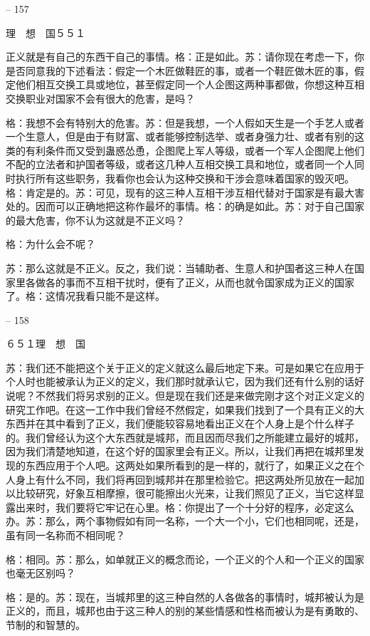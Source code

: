 \documentclass[11pt,oneside]{book}
\begin{document}
\begin{common-format}
    

-- 157

    理　想　国５５１

    正义就是有自己的东西干自己的事情。格：正是如此。苏：请你现在考虑一下，你是否同意我的下述看法：假定一个木匠做鞋匠的事，或者一个鞋匠做木匠的事，假定他们相互交换工具或地位，甚至假定同一个人企图这两种事都做，你想这种互相交换职业对国家不会有很大的危害，是吗？

    格：我想不会有特别大的危害。苏：但是我想，一个人假如天生是一个手艺人或者一个生意人，但是由于有财富、或者能够控制选举、或者身强力壮、或者有别的这类的有利条件而又受到蛊惑怂恿，企图爬上军人等级，或者一个军人企图爬上他们不配的立法者和护国者等级，或者这几种人互相交换工具和地位，或者同一个人同时执行所有这些职务，我看你也会认为这种交换和干涉会意味着国家的毁灭吧。格：肯定是的。苏：可见，现有的这三种人互相干涉互相代替对于国家是有最大害处的。因而可以正确地把这称作最坏的事情。格：的确是如此。苏：对于自己国家的最大危害，你不认为这就是不正义吗？

    格：为什么会不呢？

    苏：那么这就是不正义。反之，我们说：当辅助者、生意人和护国者这三种人在国家里各做各的事而不互相干扰时，便有了正义，从而也就令国家成为正义的国家了。格：这情况我看只能不是这样。

    

-- 158

    ６５１理　想　国

    苏：我们还不能把这个关于正义的定义就这么最后地定下来。可是如果它在应用于个人时也能被承认为正义的定义，我们那时就承认它，因为我们还有什么别的话好说呢？不然我们将另求别的正义。但是现在我们还是来做完刚才这个对正义定义的研究工作吧。在这一工作中我们曾经不然假定，如果我们找到了一个具有正义的大东西并在其中看到了正义，我们便能较容易地看出正义在个人身上是个什么样子的。我们曾经认为这个大东西就是城邦，而且因而尽我们之所能建立最好的城邦，因为我们清楚地知道，在这个好的国家里会有正义。所以，让我们再把在城邦里发现的东西应用于个人吧。这两处如果所看到的是一样的，就行了，如果正义之在个人身上有什么不同，我们将再回到城邦并在那里检验它。把这两处所见放在一起加以比较研究，好象互相摩擦，很可能擦出火光来，让我们照见了正义，当它这样显露出来时，我们要将它牢记在心里。格：你提出了一个十分好的程序，必定这么办。苏：那么，两个事物假如有同一名称，一个大一个小，它们也相同呢，还是，虽有同一名称而不相同呢？

    格：相同。苏：那么，如单就正义的概念而论，一个正义的个人和一个正义的国家也毫无区别吗？

    格：是的。苏：现在，当城邦里的这三种自然的人各做各的事情时，城邦被认为是正义的，而且，城邦也由于这三种人的别的某些情感和性格而被认为是有勇敢的、节制的和智慧的。


\end{common-format}
\end{document}
